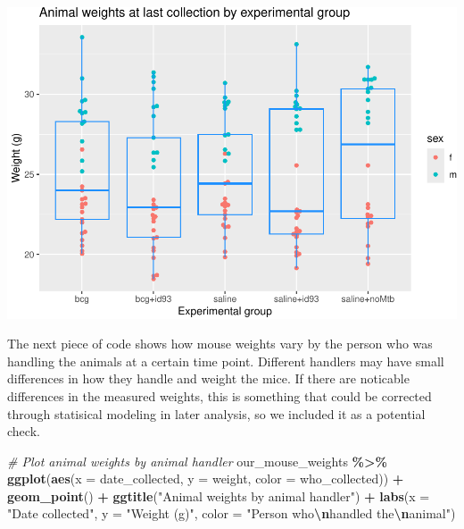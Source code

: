 \documentclass[
]{book}
\newenvironment{Shaded}{\begin{snugshade}}{\end{snugshade}}
\newcommand{\AttributeTok}[1]{\textcolor[rgb]{0.13,0.29,0.53}{#1}}
\newcommand{\CommentTok}[1]{\textcolor[rgb]{0.56,0.35,0.01}{\textit{#1}}}
\newcommand{\FunctionTok}[1]{\textcolor[rgb]{0.13,0.29,0.53}{\textbf{#1}}}
\newcommand{\NormalTok}[1]{#1}
\newcommand{\SpecialCharTok}[1]{\textcolor[rgb]{0.81,0.36,0.00}{\textbf{#1}}}
\newcommand{\StringTok}[1]{\textcolor[rgb]{0.31,0.60,0.02}{#1}}
\begin{document}
\includegraphics{csu-impactb_files/figure-latex/unnamed-chunk-16-1.pdf}

The next piece of code shows how mouse weights vary by the person who was
handling the animals at a certain time point. Different handlers may have small
differences in how they handle and weight the mice. If there are noticable
differences in the measured weights, this is something that could be corrected
through statisical modeling in later analysis, so we included it as a potential
check.

\begin{Shaded}
\begin{Highlighting}[]
\CommentTok{\# Plot animal weights by animal handler}
\NormalTok{our\_mouse\_weights }\SpecialCharTok{\%\textgreater{}\%} 
  \FunctionTok{ggplot}\NormalTok{(}\FunctionTok{aes}\NormalTok{(}\AttributeTok{x =}\NormalTok{ date\_collected, }\AttributeTok{y =}\NormalTok{ weight, }\AttributeTok{color =}\NormalTok{ who\_collected)) }\SpecialCharTok{+} 
  \FunctionTok{geom\_point}\NormalTok{() }\SpecialCharTok{+} 
  \FunctionTok{ggtitle}\NormalTok{(}\StringTok{"Animal weights by animal handler"}\NormalTok{) }\SpecialCharTok{+} 
  \FunctionTok{labs}\NormalTok{(}\AttributeTok{x =} \StringTok{"Date collected"}\NormalTok{, }
       \AttributeTok{y =} \StringTok{"Weight (g)"}\NormalTok{,}
       \AttributeTok{color =} \StringTok{"Person who}\SpecialCharTok{\textbackslash{}n}\StringTok{handled the}\SpecialCharTok{\textbackslash{}n}\StringTok{animal"}\NormalTok{)}
\end{Highlighting}
\end{Shaded}
\end{document}

